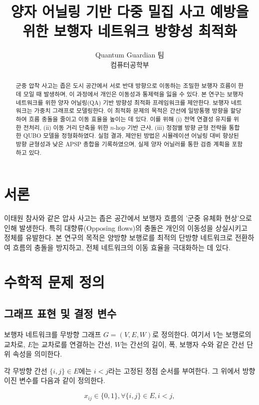 \documentclass[11pt,a4paper]{article}
\title{양자 어닐링 기반 다중 밀집 사고 예방을 위한 보행자 네트워크 방향성 최적화}
\author{
    Quantum Guardian 팀\\
    컴퓨터공학부
}
\begin{document}
\maketitle

\begin{abstract}
군중 압착 사고는 좁은 도시 공간에서 서로 반대 방향으로 이동하는
조밀한 보행자 흐름이 한데 모일 때 발생하며, 이 과정에서 개인은
이동성과 통제력을 잃을 수 있다.
본 연구는 보행자 네트워크를 위한 양자 어닐링(QA) 기반 방향성 최적화
프레임워크를 제안한다.
보행자 네트워크는 가중치 그래프로 모델링한다.
이 최적화 문제의 목적은 간선에 일방통행 방향을 할당하여 흐름 충돌을
줄이고 이동 효율을 높이는 데 있다.
이를 위해 (i) 전역 연결성 유지를 위한 전처리, (ii) 이동 거리 단축을 위한
$n$-hop 기반 근사, (iii) 정점별 방향 균형 전략을 통합한 QUBO 모델을
정형화하였다.
실험 결과, 제안된 방법은 시뮬레이션 어닐링 대비 향상된 방향 균형성과
낮은 APSP 총합을 기록하였으며, 실제 양자 어닐러를 통한 검증 계획을
포함하고 있다.
\end{abstract}

\section{서론}
이태원 참사와 같은 압사 사고는 좁은 공간에서 보행자 흐름의
'군중 유체화 현상'으로 인해 발생한다.
특히 대향류(Opposing flows)의 충돌은 개인의 이동성을 상실시키고
정체를 유발한다.
본 연구의 목적은 양방향 보행로를 최적의 단방향 네트워크로 전환하여
흐름의 충돌을 방지하고, 전체 네트워크의 이동 효율을 극대화하는 데 있다.

\section{수학적 문제 정의}

\subsection{그래프 표현 및 결정 변수}
보행자 네트워크를 무방향 그래프 $G = (V, E, W)$로 정의한다.
여기서 $V$는 보행로의 교차로, $E$는 교차로를 연결하는 간선,
$W$는 간선의 길이, 폭, 보행자 수와 같은 간선 단위 속성을 의미한다.

각 무방향 간선 $\{i, j\} \in E$에는 $i < j$라는 고정된 정점 순서를
부여한다.
그 위에서 방향 이진 변수를 다음과 같이 정의한다.

\begin{equation}
x_{ij} \in \{0, 1\},   \forall \{i, j\} \in E,  i < j,
\end{equation}
\end{document}
